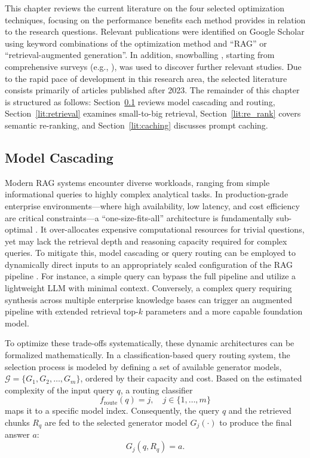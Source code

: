 This chapter reviews the current literature on the four selected optimization techniques, focusing on the performance benefits each method provides in relation to the research questions. Relevant publications were identified on Google Scholar using keyword combinations of the optimization method and ``RAG'' or ``retrieval-augmented generation''. In addition, snowballing \citep{guidelines}, starting from comprehensive surveys (e.g., \citep{gan2025rag, gao2023retrieval, wu2025ragnlp}), was used to discover further relevant studies. Due to the rapid pace of development in this research area, the selected literature consists primarily of articles published after 2023. The remainder of this chapter is structured as follows: Section~\ref{lit:cascading} reviews model cascading and routing, Section~\ref{lit:retrieval} examines small-to-big retrieval, Section~\ref{lit:re_rank} covers semantic re-ranking, and Section~\ref{lit:caching} discusses prompt caching.

\subsection{Model Cascading}
\label{lit:cascading}
Modern RAG systems encounter diverse workloads, ranging from simple informational queries to highly complex analytical tasks. In production-grade enterprise environments---where high availability, low latency, and cost efficiency are critical constraints---a ``one-size-fits-all'' architecture is fundamentally sub-optimal \citep{jeong2024adaptive, chen2024frugalgpt}. It over-allocates expensive computational resources for trivial questions, yet may lack the retrieval depth and reasoning capacity required for complex queries. To mitigate this, model cascading or query routing can be employed to dynamically direct inputs to an appropriately scaled configuration of the RAG pipeline \citep{ong2025routellm}. For instance, a simple query can bypass the full pipeline and utilize a lightweight LLM with minimal context. Conversely, a complex query requiring synthesis across multiple enterprise knowledge bases can trigger an augmented pipeline with extended retrieval top-$k$ parameters and a more capable foundation model.

To optimize these trade-offs systematically, these dynamic architectures can be formalized mathematically. In a classification-based query routing system, the selection process is modeled by defining a set of available generator models, $\mathcal{G} = \{G_1, G_2, \ldots, G_m\}$, ordered by their capacity and cost. Based on the estimated complexity of the input query $q$, a routing classifier
\begin{equation}
    f_{\text{route}}(q) = j, \quad j \in \{1, \ldots, m\}
\end{equation}
maps it to a specific model index. Consequently, the query $q$ and the retrieved chunks $R_q$ are fed to the selected generator model $G_j(\cdot)$ to produce the final answer $a$:
\begin{equation}
G_j(q, R_q) = a.
\end{equation}

